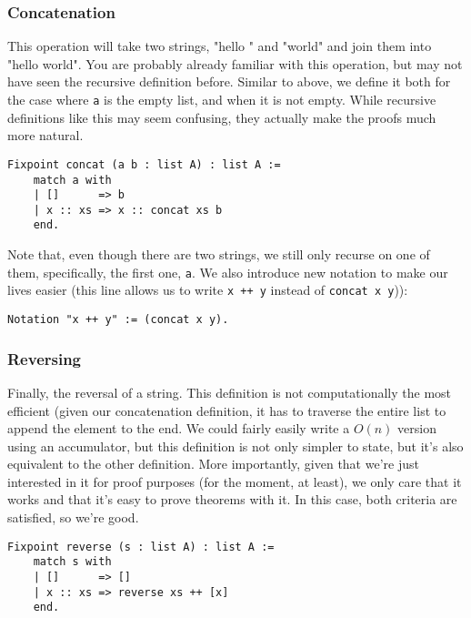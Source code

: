 \subsubsection{Concatenation}

This operation will take two strings, "hello " and "world" and join them into "hello world".
You are probably already familiar with this operation, but may not have seen the recursive definition before.
Similar to above, we define it both for the case where \texttt{a} is the empty list, and when it is not empty.
While recursive definitions like this may seem confusing, they actually make the proofs much more natural.

\begin{verbatim}
Fixpoint concat (a b : list A) : list A :=
    match a with
    | []      => b
    | x :: xs => x :: concat xs b
    end.
\end{verbatim}

Note that, even though there are two strings, we still only recurse on one of them, specifically, the first one, \texttt{a}.
We also introduce new notation to make our lives easier (this line allows us to write \texttt{x ++ y} instead of \texttt{concat x y})):

\begin{verbatim}
Notation "x ++ y" := (concat x y).
\end{verbatim}

\subsubsection{Reversing}

Finally, the reversal of a string.
This definition is not computationally the most efficient (given our concatenation definition, it has to traverse the entire list to append the element to the end.
We could fairly easily write a $O(n)$ version using an accumulator, but this definition is not only simpler to state, but it's also equivalent to the other definition.
More importantly, given that we're just interested in it for proof purposes (for the moment, at least), we only care that it works and that it's easy to prove theorems with it.
In this case, both criteria are satisfied, so we're good.

\begin{verbatim}
Fixpoint reverse (s : list A) : list A :=
    match s with
    | []      => []
    | x :: xs => reverse xs ++ [x]
    end.
\end{verbatim}

